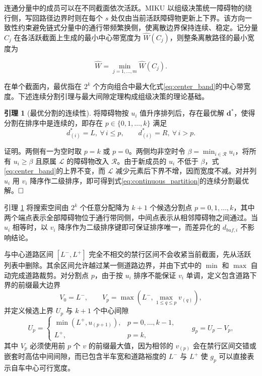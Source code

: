 \documentclass[a4paper,zihao=5]{ctexart}
\theoremstyle{definition}
\newtheorem{lemma}{引理}[section]
\begin{document}
连通分量中的成员可以在不同截面依次活跃。MIKU 以组级决策统一障碍物的绕行侧，写回路径边界时则在每个 $s$ 处仅由当前活跃障碍物更新上下界。该方向一致性约束避免链式分量中的通行带频繁换侧，使离散边界保持连续、稳定。记分量 $C_j$ 在各活跃截面上生成的最小中心带宽度为 $\hat W(C_j)$，则整条离散路径的最小宽度为

\begin{equation}
    \hat{W} = \min_{j=1,\ldots,m} \hat{W}(C_j).
    \label{eq:global_width}
\end{equation}

在单个截面内，最优指在 $2^k$ 个方向组合中最大化式\eqref{eq:center_band}的中心带宽度。下述连续分割引理与最大间隙定理构成组级决策的理论基础。

\begin{lemma}[最优分割的连续性]
\label{lem:continuous_partition}
将障碍物按 $u_i$ 值升序排列后，存在最优解 $\mathbf{d}^{*}$，使得分割在排序中是连续的，即存在 $p \in \{0, 1, \ldots, k\}$ 满足
\begin{equation}
    d_{(i)}^{*} = L,\ \forall\, i \leq p, \qquad d_{(i)}^{*} = R,\ \forall\, i > p.
    \label{eq:continuous_partition}
\end{equation}
\end{lemma}

证明。两侧有一为空时取 $p=k$ 或 $p=0$。两侧均非空时令 $\beta=\min_{i\in\mathcal R}u_i$，将所有 $u_i\geq\beta$ 且原属 $\mathcal L$ 的障碍物改入 $\mathcal R$。由于新成员的 $u_i$ 不低于 $\beta$，式\eqref{eq:center_band}的上界不变，而 $\mathcal L$ 减少元素后下界不增，因而宽度不减。对并列 $u_i$ 用 $v_i$ 降序作二级排序，即可得到式\eqref{eq:continuous_partition}的连续分割最优解。$\hfill\Box$

引理 \ref{lem:continuous_partition} 将搜索空间由 $2^k$ 个任意分配降为 $k+1$ 个候选分割点 $p=0,1,\ldots,k$，其中两个端点表示全部障碍物位于通行带同侧，中间点表示从相邻障碍物之间通过。当 $u_i$ 相等时，以 $v_i$ 降序作为二级排序键即可保证排序唯一，而差异化的 $d_{buf,i}$ 不影响结论。

与中心道路区间 $[L^-,L^+]$ 完全不相交的禁行区间不会收紧当前截面，先从活跃列表中删除。其余区间允许越过某一侧道路边界，并由下式中的 $\min$ 和 $\max$ 自动完成道路裁剪。对分割点 $p$，由于按 $u_i$ 排序不能保证 $v_i$ 单调，定义包含道路下界的前缀最大边界
\begin{equation}
    V_0=L^{-},\qquad V_p=\max\!\left(L^{-},\max_{1\leq q\leq p}v_{(q)}\right),
    \label{eq:prefix_v}
\end{equation}
并定义候选上界 $U_p$ 与 $k+1$ 个中心间隙
\begin{equation}
    U_p=\begin{cases}
        \min(L^{+},u_{(p+1)}), & p=0,\ldots,k-1,\\
        L^{+}, & p=k,
    \end{cases}
    \qquad g_p=U_p-V_p,
    \label{eq:gap_def}
\end{equation}
其中 $V_p$ 必须使用前 $p$ 个 $v$ 的前缀最大值，因为相邻的 $v_{(p)}$ 会在禁行区间交错或嵌套时高估中间间隙，而已包含半车宽和道路裕度的 $L^-$ 与 $L^+$ 使 $g_p$ 可以直接表示自车中心可行宽度。
\end{document}

